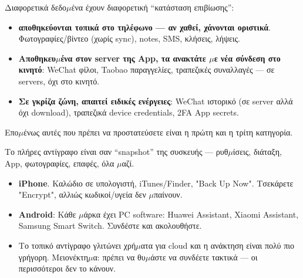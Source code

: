 


Διαφορετικά δεδο$\mu$ένα έχουν διαφορετική “κατάσταση επιβίωσης”:

\begin{itemize}
  \item \textbf{αποθηκεύονται τοπικά στο τηλέφωνο — αν χαθεί, χάνονται οριστικά}. Φωτογραφίες/βίντεο (χωρίς sync), notes, SMS, κλήσεις, λήψεις.
  \item \textbf{Αποθηκευ$\mu$ένα στον server της App, τα ανακτάτε $\mu$ε νέα σύνδεση στο κινητό}: WeChat φίλοι, Taobao παραγγελίες, τραπεζικές συναλλαγές — σε servers, όχι στο κινητό.
  \item \textbf{Σε γκρίζα ζώνη, απαιτεί ειδικές ενέργειες}: WeChat ιστορικό (σε server αλλά όχι download), τραπεζικά device credentials, 2FA App secrets.
\end{itemize}

Επο$\mu$ένως αυτές που πρέπει να προστατεύσετε είναι η πρώτη και η τρίτη κατηγορία.


Το πλήρες αντίγραφο είναι σαν “snapshot” της συσκευής — ρυθ$\mu$ίσεις, διάταξη, App, φωτογραφίες, επαφές, όλα $\mu$αζί.


\begin{itemize}
  \item \textbf{iPhone}. Καλώδιο σε υπολογιστή, iTunes/Finder, "Back Up Now". Τσεκάρετε "Encrypt", αλλιώς κωδικοί/υγεία δεν $\mu$παίνουν.
  \item \textbf{Android}: Κάθε $\mu$άρκα έχει PC software: Huawei Assistant, Xiaomi Assistant, Samsung Smart Switch. Συνδέστε και ακολουθήστε.
  \item Το τοπικό αντίγραφο γλιτώνει χρή$\mu$ατα για cloud και η ανάκτηση είναι πολύ πιο γρήγορη. Μειονέκτη$\mu$α: πρέπει να θυ$\mu$άστε να συνδέετε τακτικά — οι περισσότεροι δεν το κάνουν.
\end{itemize}

